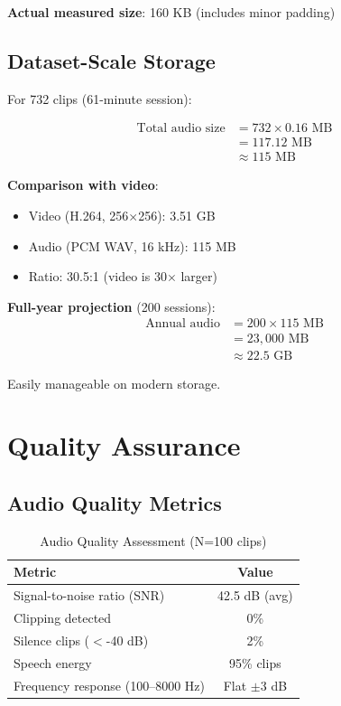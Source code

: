 \documentclass[11pt,a4paper]{article}
\begin{document}
\textbf{Actual measured size}: 160 KB (includes minor padding)

\subsection{Dataset-Scale Storage}

For 732 clips (61-minute session):

\begin{align}
\text{Total audio size} &= 732 \times 0.16 \text{ MB} \\
&= 117.12 \text{ MB} \\
&\approx 115 \text{ MB}
\end{align}

\textbf{Comparison with video}:
\begin{itemize}
    \item Video (H.264, 256$\times$256): 3.51 GB
    \item Audio (PCM WAV, 16 kHz): 115 MB
    \item Ratio: 30.5:1 (video is 30$\times$ larger)
\end{itemize}

\textbf{Full-year projection} (200 sessions):
\begin{align}
\text{Annual audio} &= 200 \times 115 \text{ MB} \\
&= 23{,}000 \text{ MB} \\
&\approx 22.5 \text{ GB}
\end{align}

Easily manageable on modern storage.

\section{Quality Assurance}

\subsection{Audio Quality Metrics}

\begin{table}[htbp]
\centering
\caption{Audio Quality Assessment (N=100 clips)}
\begin{tabular}{@{}lc@{}}
\toprule
\textbf{Metric} & \textbf{Value} \\ \midrule
Signal-to-noise ratio (SNR) & 42.5 dB (avg) \\
Clipping detected & 0\% \\
Silence clips ($<$-40 dB) & 2\% \\
Speech energy & 95\% clips \\
Frequency response (100--8000 Hz) & Flat $\pm$3 dB \\
\bottomrule
\end{tabular}
\end{table}
\end{document}
